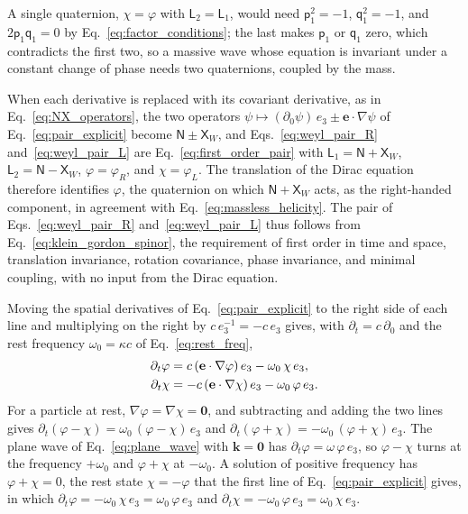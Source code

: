\documentclass[aps,prd,onecolumn,tightenlines,nofootinbib,notitlepage,11pt,floatfix]{revtex4-2}
\theoremstyle{indentedtheorem}
\begin{document}
A single quaternion, $\chi=\varphi$ with $\mathsf{L}_2=\mathsf{L}_1$, would need $\mathsf{p}_1^2=-1$, $\mathsf{q}_1^2=-1$, and $2\mathsf{p}_1\mathsf{q}_1=0$ by Eq.~\eqref{eq:factor_conditions}; the last makes $\mathsf{p}_1$ or $\mathsf{q}_1$ zero, which contradicts the first two, so a massive wave whose equation is invariant under a constant change of phase needs two quaternions, coupled by the mass.

When each derivative is replaced with its covariant derivative, as in Eq.~\eqref{eq:NX_operators}, the two operators $\psi\mapsto(\partial_0\psi)\,e_3\pm\mathbf{e}\cdot\nabla\psi$ of Eq.~\eqref{eq:pair_explicit} become $\mathsf{N}\pm\mathsf{X}_W$, and Eqs.~\eqref{eq:weyl_pair_R} and~\eqref{eq:weyl_pair_L} are Eq.~\eqref{eq:first_order_pair} with $\mathsf{L}_1=\mathsf{N}+\mathsf{X}_W$, $\mathsf{L}_2=\mathsf{N}-\mathsf{X}_W$, $\varphi=\varphi_R$, and $\chi=\varphi_L$. The translation of the Dirac equation therefore identifies $\varphi$, the quaternion on which $\mathsf{N}+\mathsf{X}_W$ acts, as the right-handed component, in agreement with Eq.~\eqref{eq:massless_helicity}. The pair of Eqs.~\eqref{eq:weyl_pair_R} and~\eqref{eq:weyl_pair_L} thus follows from Eq.~\eqref{eq:klein_gordon_spinor}, the requirement of first order in time and space, translation invariance, rotation covariance, phase invariance, and minimal coupling, with no input from the Dirac equation.

Moving the spatial derivatives of Eq.~\eqref{eq:pair_explicit} to the right side of each line and multiplying on the right by $c\,e_3^{-1}=-c\,e_3$ gives, with $\partial_t=c\,\partial_0$ and the rest frequency $\omega_0=\kappa c$ of Eq.~\eqref{eq:rest_freq},
\begin{align}
    \partial_t\varphi &= c \, (\mathbf{e}\cdot\nabla\varphi) \, e_3 - \omega_0 \, \chi \, e_3 , \notag\\
    \partial_t\chi &= -c \, (\mathbf{e}\cdot\nabla\chi) \, e_3 - \omega_0 \, \varphi \, e_3 .
    \label{eq:pair_rates}
\end{align}
For a particle at rest, $\nabla\varphi=\nabla\chi=\mathbf{0}$, and subtracting and adding the two lines gives $\partial_t(\varphi-\chi)=\omega_0\,(\varphi-\chi)\,e_3$ and $\partial_t(\varphi+\chi)=-\omega_0\,(\varphi+\chi)\,e_3$. The plane wave of Eq.~\eqref{eq:plane_wave} with $\mathbf{k}=\mathbf{0}$ has $\partial_t\varphi=\omega\,\varphi\,e_3$, so $\varphi-\chi$ turns at the frequency $+\omega_0$ and $\varphi+\chi$ at $-\omega_0$. A solution of positive frequency has $\varphi+\chi=0$, the rest state $\chi=-\varphi$ that the first line of Eq.~\eqref{eq:pair_explicit} gives, in which $\partial_t\varphi=-\omega_0\,\chi\,e_3=\omega_0\,\varphi\,e_3$ and $\partial_t\chi=-\omega_0\,\varphi\,e_3=\omega_0\,\chi\,e_3$.
\end{document}

